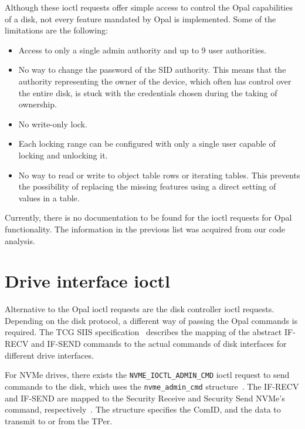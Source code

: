 Although these ioctl requests offer simple access to control the Opal capabilities of a disk, not every feature mandated by Opal is implemented. Some of the limitations are the following: 
\begin{itemize}
\item Access to only a single admin authority and up to 9 user authorities.
\item No way to change the password of the SID authority. This means that the authority representing the owner of the device, which often has control over the entire disk, is stuck with the credentials chosen during the taking of ownership. 
\item No write-only lock.
\item Each locking range can be configured with only a single user capable of locking and unlocking it.
\item No way to read or write to object table rows or iterating tables. This prevents the possibility of replacing the missing features using a direct setting of values in a table.
\end{itemize}

Currently, there is no documentation to be found for the ioctl requests for Opal functionality. The information in the previous list was acquired from our code analysis.

\section{Drive interface ioctl}
\label{section:direct_communication_raw_ioctl}

Alternative to the Opal ioctl requests are the disk controller ioctl requests. Depending on the disk protocol, a different way of passing the Opal commands is required.
The TCG SIIS specification~\cite{tcg-siis} describes the mapping of the abstract IF-RECV and IF-SEND commands to the actual commands of disk interfaces for different drive interfaces.

For NVMe drives, there exists the \verb|NVME_IOCTL_ADMIN_CMD| ioctl request to send commands to the disk, which uses the \verb|nvme_admin_cmd| structure~\cite{nvme-express-base-specification}. The IF-RECV and IF-SEND are mapped to the Security Receive and Security Send NVMe's command, respectively~\cite{tcg-siis}. The structure specifies the ComID, and the data to transmit to or from the TPer.

